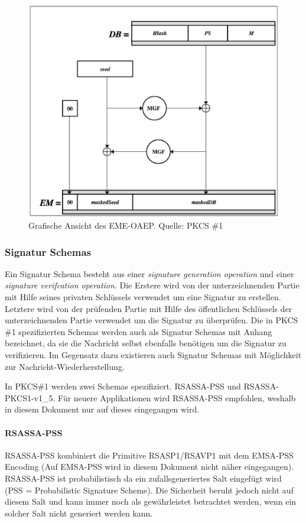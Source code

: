 \documentclass[10pt,a4paper]{article}
\begin{document}
\begin{figure}[ht]
    \centering
    \includegraphics[scale=0.48]{images/eme-oap-graph}
    \caption{Grafische Ansicht des EME-OAEP. \small{Quelle: PKCS \#1}}
    \label{fig:eme-oap-graph}
\end{figure}


\subsubsection{Signatur Schemas}
Ein Signatur Schema besteht aus einer \textit{signature generation operation} und einer
\textit{signature verifcation operation}. Die Erstere wird von der unterzeichnenden Partie
mit Hilfe seines privaten Schlüssels verwendet um eine Signatur zu erstellen. Letztere
wird von der prüfenden Partie mit Hilfe des öffentlichen Schlüssels der unterzeichnenden
Partie verwendet um die Signatur zu überprüfen. Die in PKCS \#1 spezifizierten Schemas
werden auch als Signatur Schemas mit Anhang bezeichnet, da sie die Nachricht selbst
ebenfalls benötigen um die Signatur zu verifizieren. Im Gegensatz dazu existieren auch
Signatur Schemas mit Möglichkeit zur Nachricht-Wiederherstellung.

In PKCS\#1 werden zwei Schemas spezifiziert. RSASSA-PSS und RSASSA-PKCS1-v1\_5. Für neuere
Applikationen wird RSASSA-PSS empfohlen, weshalb in diesem Dokument nur auf dieses
eingegangen wird.

\paragraph{RSASSA-PSS}
RSASSA-PSS kombiniert die Primitive RSASP1/RSAVP1 mit dem EMSA-PSS Encoding (Auf EMSA-PSS
wird in diesem Dokument nicht näher eingegangen). RSASSA-PSS ist probabilistisch da ein
zufallsgeneriertes Salt eingefügt wird (PSS = Probabilistic Signature Scheme). Die
Sicherheit beruht jedoch nicht auf diesem Salt und kann immer noch als gewährleistet
betrachtet werden, wenn ein solcher Salt nicht generiert werden kann.
\end{document}

